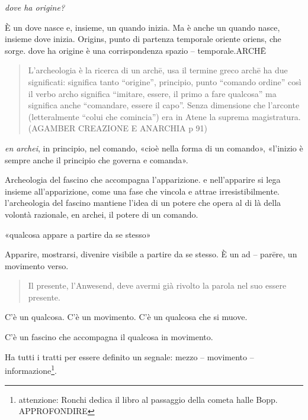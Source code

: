 \documentclass{gs}
\begin{document}
\emph{dove ha origine?}

È un dove nasce e, insieme, un quando inizia. Ma è anche un quando nasce, insieme dove inizia. Origins, punto di partenza temporale oriente oriens, che sorge. dove ha origine è una corrispondenza spazio – temporale.ARCHĒ


\begin{quote}
\begin{sf}
\small
L'archeologia è la ricerca di un archē, usa il termine greco archē ha due significati: significa tanto “origine”, principio, punto “comando ordine” così il verbo archo significa “imitare, essere, il primo a fare qualcosa” ma significa anche “comandare, essere il capo”. Senza dimensione che l'arconte (letteralmente “colui che comincia”) era in Atene la suprema magistratura. (AGAMBER CREAZIONE E ANARCHIA p 91) 
\end{sf}
\end{quote}

\emph{en archei}, in principio, nel comando, «cioè nella forma di un comando», «l'inizio è sempre anche il principio che governa e comanda».

Archeologia del fascino che accompagna l'apparizione. e nell'apparire si lega insieme all'apparizione, come una fase che vincola e attrae irresistibilmente. l'archeologia del fascino mantiene l'idea di un potere che opera al di là della volontà razionale, en archei, il potere di un comando.

«qualcosa appare a partire da se stesso» \cite{agamben2019}

Apparire, mostrarsi, divenire visibile a partire da se stesso. È un ad – parēre, un movimento verso.

\begin{quote}
\begin{sf}
\small
Il presente, l'Anwesend, deve avermi già rivolto la parola nel suo essere presente. \cite{agamben2019}
\end{sf}
\end{quote}

C'è un qualcosa. C'è un movimento. C'è un qualcosa che si muove.

C'è un fascino che accompagna il qualcosa in movimento.

Ha tutti i tratti per essere definito un segnale: mezzo – movimento – informazione\footnote{attenzione: Ronchi dedica il libro al passaggio della cometa halle Bopp. APPROFONDIRE}. 
\end{document}
